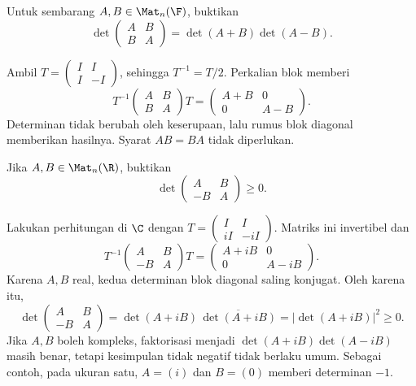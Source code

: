 \begin{exam}
      Untuk sembarang $A,B\in\Mat_n(\F)$, buktikan
      \[
            \det\begin{pmatrix}A&B\\B&A\end{pmatrix}
            =\det(A+B)\det(A-B).
      \]
\end{exam}
\begin{solution}
      Ambil $T=\left(\begin{smallmatrix}I&I\\I&-I\end{smallmatrix}\right)$,
      sehingga $T^{-1}=T/2$. Perkalian blok memberi
      \[
            T^{-1}\begin{pmatrix}A&B\\B&A\end{pmatrix}T
            =\begin{pmatrix}A+B&0\\0&A-B\end{pmatrix}.
      \]
      Determinan tidak berubah oleh keserupaan, lalu rumus blok diagonal
      memberikan hasilnya. Syarat $AB=BA$ tidak diperlukan.
\end{solution}

\begin{exam}
      Jika $A,B\in\Mat_n(\R)$, buktikan
      \[
            \det\begin{pmatrix}A&B\\-B&A\end{pmatrix}\ge0.
      \]
\end{exam}
\begin{solution}
      Lakukan perhitungan di $\C$ dengan
      $T=\left(\begin{smallmatrix}I&I\\iI&-iI\end{smallmatrix}\right)$.
      Matriks ini invertibel dan
      \[
            T^{-1}\begin{pmatrix}A&B\\-B&A\end{pmatrix}T
            =\begin{pmatrix}A+iB&0\\0&A-iB\end{pmatrix}.
      \]
      Karena $A,B$ real, kedua determinan blok diagonal saling konjugat.
      Oleh karena itu,
      \[
            \det\begin{pmatrix}A&B\\-B&A\end{pmatrix}
            =\det(A+iB)\,\overline{\det(A+iB)}
            =|\det(A+iB)|^2\ge0.
      \]
      Jika $A,B$ boleh kompleks, faktorisasi menjadi $\det(A+iB)\det(A-iB)$
      masih benar, tetapi kesimpulan tidak negatif tidak berlaku umum.
      Sebagai contoh, pada ukuran satu, $A=(i)$ dan $B=(0)$ memberi determinan $-1$.
\end{solution}


